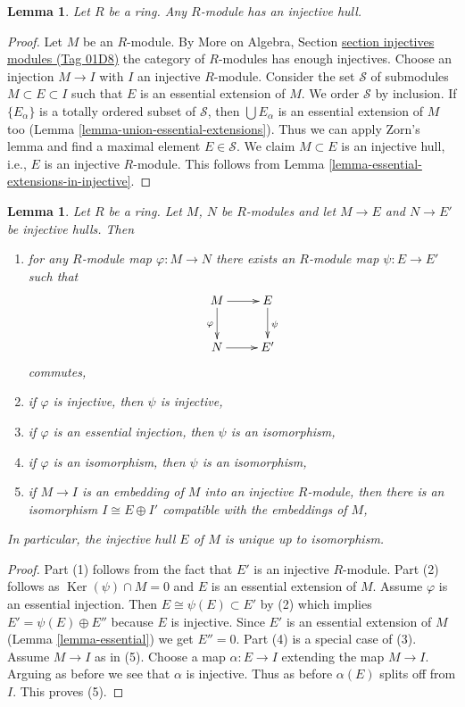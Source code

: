 \documentclass{amsart}
\theoremstyle{plain}
\newtheorem{lemma}[subsection]{Lemma}
\theoremstyle{definition}
\theoremstyle{remark}
\numberwithin{equation}{subsection}
\def\Ker{\mathop{\mathrm{Ker}}}
\begin{document}
\begin{lemma}
\label{lemma-injective-hull}
Let $R$ be a ring. Any $R$-module has an injective hull.
\end{lemma}

\begin{proof}
Let $M$ be an $R$-module. By
More on Algebra, Section \href{https://stacks.math.columbia.edu/tag/01D8}{section injectives modules (Tag 01D8)}
the category of $R$-modules has enough injectives.
Choose an injection $M \to I$ with $I$ an injective $R$-module.
Consider the set $\mathcal{S}$ of submodules $M \subset E \subset I$
such that $E$ is an essential extension of $M$. We order $\mathcal{S}$
by inclusion. If $\{E_\alpha\}$ is a totally ordered subset
of $\mathcal{S}$, then $\bigcup E_\alpha$ is an essential extension of $M$
too (Lemma \ref{lemma-union-essential-extensions}).
Thus we can apply Zorn's lemma and find a maximal element
$E \in \mathcal{S}$. We claim $M \subset E$ is an injective hull, i.e.,
$E$ is an injective $R$-module. This follows from
Lemma \ref{lemma-essential-extensions-in-injective}.
\end{proof}


\begin{lemma}
\label{lemma-injective-hull-unique}
Let $R$ be a ring. Let $M$, $N$ be $R$-modules and let $M \to E$
and $N \to E'$ be injective hulls. Then
\begin{enumerate}
\item for any $R$-module map $\varphi : M \to N$ there exists an
$R$-module map $\psi : E \to E'$ such that
$$
\xymatrix{
M \ar[r] \ar[d]_\varphi & E \ar[d]^\psi \\
N \ar[r] & E'
}
$$
commutes,
\item if $\varphi$ is injective, then $\psi$ is injective,
\item if $\varphi$ is an essential injection, then $\psi$ is an isomorphism,
\item if $\varphi$ is an isomorphism, then $\psi$ is an isomorphism,
\item if $M \to I$ is an embedding of $M$ into an injective $R$-module,
then there is an isomorphism $I \cong E \oplus I'$ compatible with
the embeddings of $M$,
\end{enumerate}
In particular, the injective hull $E$ of $M$ is unique up to isomorphism.
\end{lemma}

\begin{proof}
Part (1) follows from the fact that $E'$ is an injective $R$-module.
Part (2) follows as $\Ker(\psi) \cap M = 0$
and $E$ is an essential extension of $M$.
Assume $\varphi$ is an essential injection. Then
$E \cong \psi(E) \subset E'$ by (2) which implies
$E' = \psi(E) \oplus E''$ because $E$ is injective.
Since $E'$ is an essential extension of
$M$ (Lemma \ref{lemma-essential}) we get $E'' = 0$.
Part (4) is a special case of (3).
Assume $M \to I$ as in (5).
Choose a map $\alpha : E \to I$ extending the map $M \to I$.
Arguing as before we see that $\alpha$ is injective.
Thus as before $\alpha(E)$ splits off from $I$.
This proves (5).
\end{proof}
\end{document}
